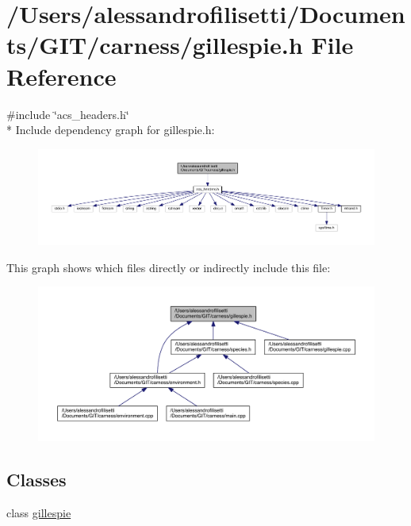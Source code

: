 \hypertarget{a00067}{\section{/\+Users/alessandrofilisetti/\+Documents/\+G\+I\+T/carness/gillespie.h File Reference}
\label{a00067}
}
{\ttfamily \#include \char`\"{}acs\+\_\+headers.\+h\char`\"{}}\\*
Include dependency graph for gillespie.\+h\+:\nopagebreak
\begin{figure}[H]
\begin{center}
\leavevmode
\includegraphics[width=350pt]{a00188}
\end{center}
\end{figure}
This graph shows which files directly or indirectly include this file\+:\nopagebreak
\begin{figure}[H]
\begin{center}
\leavevmode
\includegraphics[width=350pt]{a00189}
\end{center}
\end{figure}
\subsection*{Classes}
\begin{DoxyCompactItemize}
\item 
class \hyperlink{a00014}{gillespie}
\end{DoxyCompactItemize}
